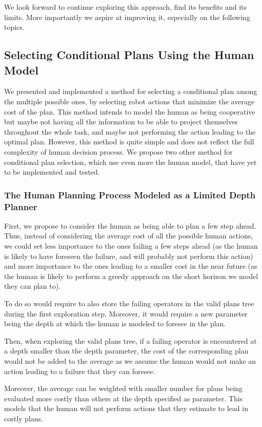\documentclass[a4paper,11pt,twoside]{StyleThese}
\begin{document}
We look forward to continue exploring this approach, find its benefits and its limits. More importantly we aspire at improving it, especially on the following topics.

\subsection{Selecting Conditional Plans Using the Human Model}
\label{subsec:chap4selectingplan}
We presented and implemented a method for selecting a conditional plan among the multiple possible ones, by selecting robot actions that minimize the average cost of the plan. This method intends to model the human as being cooperative but maybe not having all the information to be able to project themselves throughout the whole task, and maybe not performing the action leading to the optimal plan. However, this method is quite simple and does not reflect the full complexity of human decision process. We propose two other method for conditional plan selection, which use even more the human model, that have yet to be implemented and tested.

\subsubsection{The Human Planning Process Modeled as a Limited Depth Planner}
First, we propose to consider the human as being able to plan a few step ahead. Thus, instead of considering the average cost of all the possible human actions, we could set less importance to the ones failing a few steps ahead (as the human is likely to have foreseen the failure, and will probably not perform this action) and more importance to the ones leading to a smaller cost in the near future (as the human is likely to perform a greedy approach on the short horizon we model they can plan to).

To do so would require to also store the failing operators in the valid plans tree during the first exploration step. Moreover, it would require a new parameter being the depth at which the human is modeled to foresee in the plan. 

Then, when exploring the valid plans tree, if a failing operator is encountered at a depth smaller than the depth parameter, the cost of the corresponding plan would not be added to the average as we assume the human would not make an action leading to a failure that they can foresee. 

Moreover, the average can be weighted with smaller number for plans being evaluated more costly than others at the depth specified as parameter. This models that the human will not perform actions that they estimate to lead in costly plans.
\end{document}

